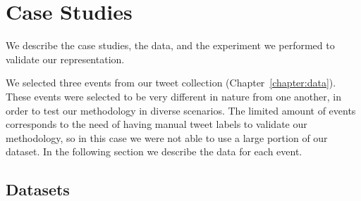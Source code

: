\section{Case Studies}
\label{sec:experimental}

We describe the case studies, the data, and the experiment we performed to
validate our representation.
%

We selected three events from our tweet collection (Chapter~\ref{chapter:data}). 
%
These events were selected to be very different in nature from one another, in
order to test our methodology in diverse scenarios. 
%
The limited amount of events corresponds to the need of having manual tweet
labels to validate our methodology, so in this case we were not able to use a
large portion of our dataset. 
%
In the following section we describe the data for each event.


\subsection{Datasets}

